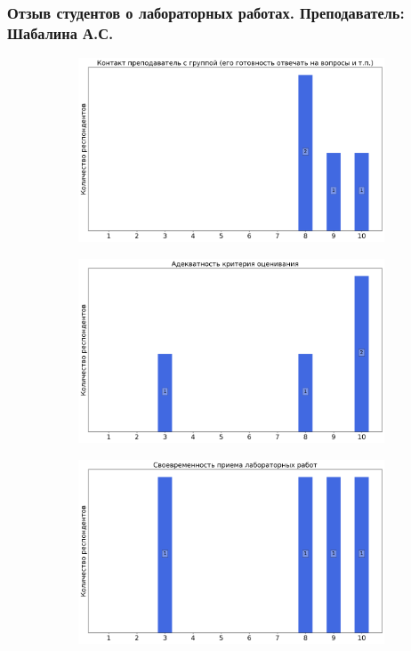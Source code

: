     \subsubsection{Отзыв студентов о лабораторных работах. Преподаватель: Шабалина А.С.}
		\begin{figure}[H]
			\centering
			\begin{subfigure}[b]{0.45\textwidth}
				\centering
				\includegraphics[width=\textwidth]{images/3 course/Аналоговая электроника/labniks-marks-Шабалина А.С.-0.png}
			\end{subfigure}
			\begin{subfigure}[b]{0.45\textwidth}
				\centering
				\includegraphics[width=\textwidth]{images/3 course/Аналоговая электроника/labniks-marks-Шабалина А.С.-1.png}
			\end{subfigure}
			\begin{subfigure}[b]{0.45\textwidth}
				\centering
				\includegraphics[width=\textwidth]{images/3 course/Аналоговая электроника/labniks-marks-Шабалина А.С.-2.png}

\end{subfigure}
\end{figure}

